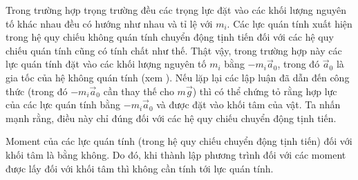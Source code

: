 Trong trường hợp trọng trường đều các trọng lực đặt vào các khối lượng nguyên tố khác nhau đều có hướng như nhau và tỉ lệ với $m_i$. Các lực quán tính xuất hiện trong hệ quy chiếu không quán tính chuyển động tịnh tiến đối với các hệ quy chiếu quán tính cũng có tính chất như thế. Thật vậy, trong trường hợp này các lực quán tính đặt vào các khối lượng nguyên tố $m_i$ bằng $-m_i\vec{a}_0$, trong đó $\vec{a}_0$ là gia tốc của hệ không quán tính (xem ). Nếu lặp lại các lập luận đã dẫn đến công thức  (trong đó $-m_i\vec{a}_0$ cần thay thế cho $m\vec{g}$) thì có thể chứng tỏ rằng hợp lực của các lực quán tính bằng $-m_i\vec{a}_0$ và được đặt vào khối tâm của vật. Ta nhấn mạnh rằng, điều này chỉ đúng đối với các hệ quy chiếu chuyển động tịnh tiến.

Moment của các lực quán tính (trong hệ quy chiếu chuyển động tịnh tiến) đối với khối tâm là bằng không. Do đó, khi thành lập phương trình  đối với các moment được lấy đối với khối tâm thì không cần tính tới lực quán tính.

